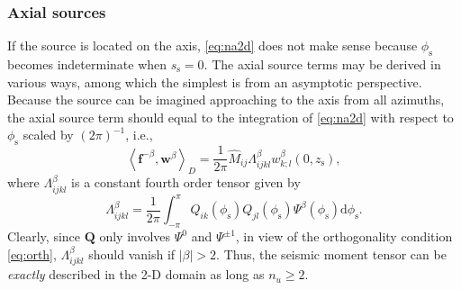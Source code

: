 \documentclass[extra,referee]{gji}
\begin{document}
\subsubsection{Axial sources}
If the source is located on the axis, \eqref{eq:na2d} does not make sense
because $\phi_\text{s}$ becomes indeterminate when $s_\text{s}=0$. 
The axial source terms may be derived in various ways,
among which the simplest is from an asymptotic perspective.
Because the source can be imagined approaching 
to the axis from all azimuths, the axial source term 
should equal to the integration of \eqref{eq:na2d}
with respect to $\phi_\text{s}$ scaled by $\left(2\pi\right)^{-1}$, i.e., 
\begin{equation}
  \left\langle \mathbf{f}^{-\beta},\mathbf{w}^\beta \right\rangle _{D}
  = \frac{1}{2\pi}
  \hat{M}_{ij} \Lambda_{ijkl}^\beta w_{k;l}^\beta\left(0,z_\text{s}\right),
  \label{eq:ax2d} 
\end{equation}
where $\Lambda_{ijkl}^\beta$ is a constant fourth order tensor given by 
\begin{equation}
  \Lambda_{ijkl}^\beta=\frac{1}{2\pi}\int_{-\pi}^{\pi}
  Q_{ik}\left(\phi_\text{s}\right) Q_{jl}\left(\phi_\text{s}\right)
  \Psi^\beta\left(\phi_\text{s}\right) \text{d}\phi_\text{s}.
\end{equation}
Clearly, since $\mathbf{Q}$ only involves $\Psi^0$ and $\Psi^{\pm1}$,
in view of the orthogonality condition \eqref{eq:orth}, $\Lambda_{ijkl}^\beta$
should vanish if $|\beta|>2$. Thus, the seismic moment tensor can be 
\textit{exactly} described in the 2-D domain as long as $n_u\ge2$.  
\end{document}
